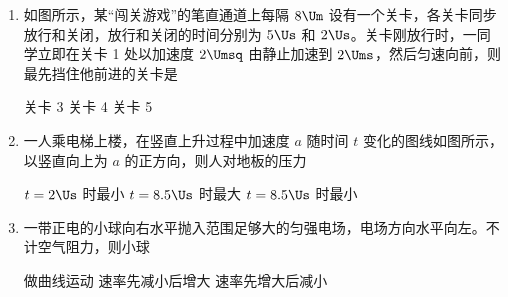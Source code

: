 \documentclass[\gkver]{gaokaozhenti}
\begin{document}
\begin{enumerate}

{figs/04b.png}
{figs/04c.png}
{figs/04d.png}


\item
如图所示，某“闯关游戏”的笔直通道上每隔 $8\Um$ 设有一个关卡，各关卡同步放行和关闭，放行和关闭的时间分别为 $5\Us$ 和 $2\Us$。关卡刚放行时，一同学立即在关卡 1 处以加速度 $2\Umsq$ 由静止加速到 $2\Ums$，然后匀速向前，则最先挡住他前进的关卡是


{关卡 3}
{关卡 4}
{关卡 5}


\item
一人乘电梯上楼，在竖直上升过程中加速度 $a$ 随时间 $t$ 变化的图线如图所示，以竖直向上为 $a$ 的正方向，则人对地板的压力


{$t=2\Us$ 时最小}
{$t=8.5\Us$ 时最大}
{$t=8.5\Us$ 时最小}


\item
一带正电的小球向右水平抛入范围足够大的匀强电场，电场方向水平向左。不计空气阻力，则小球


{做曲线运动}
{速率先减小后增大}
{速率先增大后减小}



\end{enumerate}
\end{document}
